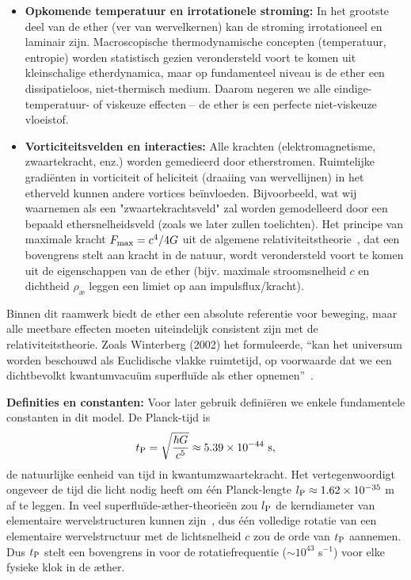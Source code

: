 \begin{itemize}
    \item \textbf{Opkomende temperatuur en irrotationele stroming:} In het grootste deel van de ether (ver van wervelkernen) kan de stroming irrotationeel en laminair zijn. Macroscopische thermodynamische concepten (temperatuur, entropie) worden statistisch gezien verondersteld voort te komen uit kleinschalige etherdynamica, maar op fundamenteel niveau is de ether een dissipatieloos, niet-thermisch medium. Daarom negeren we alle eindige-temperatuur- of viskeuze effecten – de ether is een perfecte niet-viskeuze vloeistof.

    \item \textbf{Vorticiteitsvelden en interacties:} Alle krachten (elektromagnetisme, zwaartekracht, enz.) worden gemedieerd door etherstromen. Ruimtelijke gradiënten in vorticiteit of heliciteit (draaiing van wervellijnen) in het etherveld kunnen andere vortices beïnvloeden. Bijvoorbeeld, wat wij waarnemen als een "zwaartekrachtsveld" zal worden gemodelleerd door een bepaald ethersnelheidsveld (zoals we later zullen toelichten). Het principe van maximale kracht $F_{\rm max} = c^4 / 4G$ uit de algemene relativiteitstheorie~\cite{Schiller2022-maxforce}, dat een bovengrens stelt aan kracht in de natuur, wordt verondersteld voort te komen uit de eigenschappen van de ether (bijv. maximale stroomsnelheid $c$ en dichtheid $\rho_{\text{\ae}}$ leggen een limiet op aan impulsflux/kracht).
\end{itemize}

Binnen dit raamwerk biedt de ether een absolute referentie voor beweging, maar alle meetbare effecten moeten uiteindelijk consistent zijn met de relativiteitstheorie. Zoals Winterberg (2002) het formuleerde, ``kan het universum worden beschouwd als Euclidische vlakke ruimtetijd, op voorwaarde dat we een dichtbevolkt kwantumvacuüm superfluïde als ether opnemen''~\cite{Winterberg2002-PlanckAether}.

\textbf{Definities en constanten:} Voor later gebruik definiëren we enkele fundamentele constanten in dit model. De Planck-tijd is
\[
    t_{\rm P} = \sqrt{\frac{\hbar G}{c^5}} \approx 5.39\times10^{-44}\ \text{s},
\]
de natuurlijke eenheid van tijd in kwantumzwaartekracht. Het vertegenwoordigt ongeveer de tijd die licht nodig heeft om één Planck-lengte $l_{\rm P} \approx 1.62\times10^{-35}$ m af te leggen. In veel superfluïde-æther-theorieën zou $l_{\rm P}$ de kerndiameter van elementaire wervelstructuren kunnen zijn~\cite{Winterberg2002-PlanckAether}, dus één volledige rotatie van een elementaire wervelstructuur met de lichtsnelheid $c$ zou de orde van $t_{\rm P}$ aannemen. Dus $t_{\rm P}$ stelt een bovengrens in voor de rotatiefrequentie ($\sim 10^{43}$ s$^{-1}$) voor elke fysieke klok in de æther.

